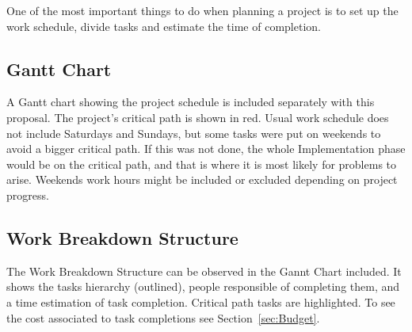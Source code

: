 
One of the most important things to do when planning a project is to set up the
work schedule, divide tasks and estimate the time of completion.

\subsection{Gantt Chart}

A Gantt chart showing the project schedule is included separately with this
proposal. The project's critical path is shown in red. Usual work schedule does
not include Saturdays and Sundays, but some tasks were put on weekends to avoid
a bigger critical path. If this was not done, the whole Implementation phase
would be on the critical path, and that is where it is most likely for problems
to arise. Weekends work hours might be included or excluded depending on project
progress.

\subsection{Work Breakdown Structure}

The Work Breakdown Structure can be observed in the Gannt Chart included. It
shows the tasks hierarchy (outlined), people responsible of completing them, and
a time estimation of task completion. Critical path tasks are highlighted. To
see the cost associated to task completions see Section~\ref{sec:Budget}.
